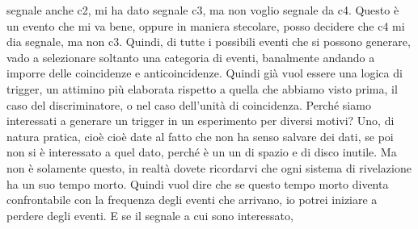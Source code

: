 segnale anche c2, mi ha dato segnale c3, ma non voglio segnale da c4. Questo è un evento che mi va bene, oppure in maniera stecolare, posso decidere che c4 mi dia segnale, ma non c3. Quindi, di tutte i possibili eventi che si possono generare, vado a selezionare soltanto una categoria di eventi, banalmente andando a imporre delle coincidenze e anticoincidenze. Quindi già vuol essere una logica di trigger, un attimino più elaborata rispetto a quella che abbiamo visto prima, il caso del discriminatore, o nel caso dell'unità di coincidenza. Perché siamo interessati a generare un trigger in un esperimento per diversi motivi? Uno, di natura pratica, cioè cioè date al fatto che non ha senso salvare dei dati, se poi non si è interessato a quel dato, perché è un un di spazio e di disco inutile. Ma non è solamente questo, in realtà dovete ricordarvi che ogni sistema di rivelazione ha un suo tempo morto. Quindi vuol dire che se questo tempo morto diventa confrontabile con la frequenza degli eventi che arrivano, io potrei iniziare a perdere degli eventi. E se il segnale a cui sono interessato, 

